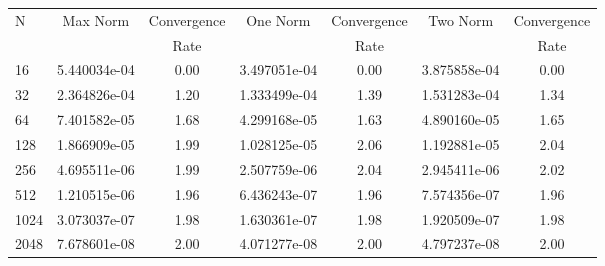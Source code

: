 \documentclass[12pt]{article}
\begin{document}
	\begin{tabular}{l|c|c|c|c|c|c}
		N&Max Norm&Convergence&One Norm&Convergence&Two Norm&Convergence\\
		&&Rate&&Rate&&Rate\\
		\hline
		16&5.440034e-04&0.00&3.497051e-04&0.00&3.875858e-04&0.00\\
		\hline
		32&2.364826e-04&1.20&1.333499e-04&1.39&1.531283e-04&1.34\\
		\hline
		64&7.401582e-05&1.68&4.299168e-05&1.63&4.890160e-05&1.65\\
		\hline
		128&1.866909e-05&1.99&1.028125e-05&2.06&1.192881e-05&2.04\\
		\hline
		256&4.695511e-06&1.99&2.507759e-06&2.04&2.945411e-06&2.02\\
		\hline
		512&1.210515e-06&1.96&6.436243e-07&1.96&7.574356e-07&1.96\\
		\hline
		1024&3.073037e-07&1.98&1.630361e-07&1.98&1.920509e-07&1.98\\
		\hline
		2048&7.678601e-08&2.00&4.071277e-08&2.00&4.797237e-08&2.00\\
	\end{tabular}
\end{document}
